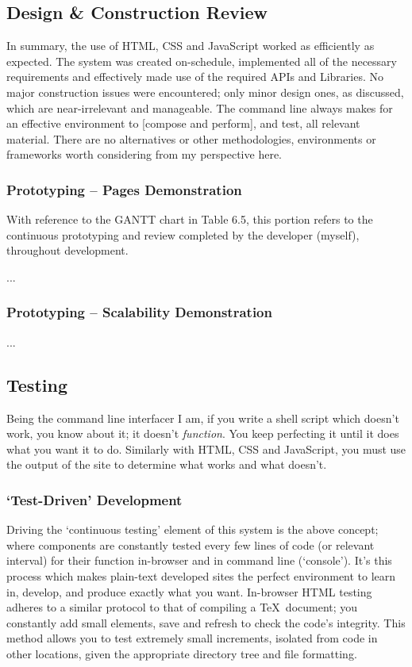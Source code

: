 \documentclass[11pt, english]{article}
\begin{document}
\newpage

	\subsection{Design \& Construction Review}

	In summary, the use of HTML, CSS and JavaScript worked as efficiently as expected. The system was created on-schedule, implemented all of the necessary requirements and effectively made use of the required APIs and Libraries. No major construction issues were encountered; only minor design ones, as discussed, which are near-irrelevant and manageable. The command line always makes for an effective environment to [compose and perform], and test, all relevant material. There are no alternatives or other methodologies, environments or frameworks worth considering from my perspective here.

		\subsubsection{Prototyping -- Pages Demonstration}

	With reference to the GANTT chart in Table 6.5, this portion refers to the continuous prototyping and review completed by the developer (myself), throughout development.

	...

		\subsubsection{Prototyping -- Scalability Demonstration}


	...

	\subsection{Testing}

	Being the command line interfacer I am, if you write a shell script which doesn't work, you know about it; it doesn't \textit{function}. You keep perfecting it until it does what you want it to do. Similarly with HTML, CSS and JavaScript, you must use the output of the site to determine what works and what doesn't.

		\subsubsection{`Test-Driven' Development}

	Driving the `continuous testing' element of this system is the above concept; where components are constantly tested every few lines of code (or relevant interval) for their function in-browser and in command line (`console'). It's this process which makes plain-text developed sites the perfect environment to learn in, develop, and produce exactly what you want. In-browser HTML testing adheres to a similar protocol to that of compiling a {\TeX}\ document; you constantly add small elements, save and refresh to check the code's integrity. This method allows you to test extremely small increments, isolated from code in other locations, given the appropriate directory tree and file formatting.\\
\end{document}
